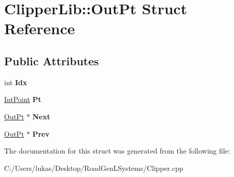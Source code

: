 \hypertarget{struct_clipper_lib_1_1_out_pt}{}\section{Clipper\+Lib\+:\+:Out\+Pt Struct Reference}
\label{struct_clipper_lib_1_1_out_pt}
\subsection*{Public Attributes}
\begin{DoxyCompactItemize}
\item 
\hypertarget{struct_clipper_lib_1_1_out_pt_ad04d3691d47a5d0d9b2ae097e7e7bf10}{}\label{struct_clipper_lib_1_1_out_pt_ad04d3691d47a5d0d9b2ae097e7e7bf10} 
int {\bfseries Idx}
\item 
\hypertarget{struct_clipper_lib_1_1_out_pt_aa01c2b1e9c5b2d8faa40701178ffcf98}{}\label{struct_clipper_lib_1_1_out_pt_aa01c2b1e9c5b2d8faa40701178ffcf98} 
\hyperlink{struct_clipper_lib_1_1_int_point}{Int\+Point} {\bfseries Pt}
\item 
\hypertarget{struct_clipper_lib_1_1_out_pt_a2d605b87f6da37dbdbef990c4fa5819e}{}\label{struct_clipper_lib_1_1_out_pt_a2d605b87f6da37dbdbef990c4fa5819e} 
\hyperlink{struct_clipper_lib_1_1_out_pt}{Out\+Pt} $\ast$ {\bfseries Next}
\item 
\hypertarget{struct_clipper_lib_1_1_out_pt_a609eb414d5764e78150cceccaffc5d54}{}\label{struct_clipper_lib_1_1_out_pt_a609eb414d5764e78150cceccaffc5d54} 
\hyperlink{struct_clipper_lib_1_1_out_pt}{Out\+Pt} $\ast$ {\bfseries Prev}
\end{DoxyCompactItemize}


The documentation for this struct was generated from the following file\+:\begin{DoxyCompactItemize}
\item 
C\+:/\+Users/lukas/\+Desktop/\+Road\+Gen\+L\+Systems/Clipper.\+cpp\end{DoxyCompactItemize}
